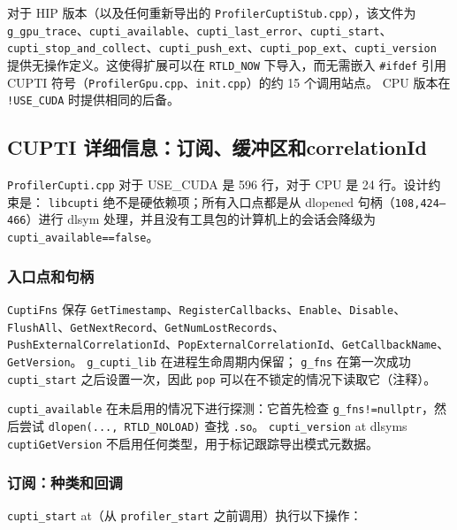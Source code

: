 对于 HIP 版本（以及任何重新导出的 \texttt{ProfilerCuptiStub.cpp}），该文件为 \texttt{g\_gpu\_trace}、\texttt{cupti\_available}、\texttt{cupti\_last\_error}、\texttt{cupti\_start}、\texttt{cupti\_stop\_and\_collect}、\texttt{cupti\_push\_ext}、\texttt{cupti\_pop\_ext}、\texttt{cupti\_version} 提供无操作定义。这使得扩展可以在 \texttt{RTLD\_NOW} 下导入，而无需嵌入 \texttt{\#ifdef} 引用 CUPTI 符号（\texttt{ProfilerGpu.cpp}、\texttt{init.cpp}）的约 15 个调用站点。 CPU 版本在 \texttt{!USE\_CUDA} 时提供相同的后备。

\subsection{CUPTI 详细信息：订阅、缓冲区和correlationId}

\texttt{ProfilerCupti.cpp} 对于 USE\_CUDA 是 596 行，对于 CPU 是 24 行。设计约束是： \texttt{libcupti} 绝不是硬依赖项；所有入口点都是从 dlopened 句柄（\texttt{108,424--466}）进行 dlsym 处理，并且没有工具包的计算机上的会话会降级为 \texttt{cupti\_available==false}。

\subsubsection{入口点和句柄}

\texttt{CuptiFns} 保存 \texttt{GetTimestamp}、\texttt{RegisterCallbacks}、\texttt{Enable}、\texttt{Disable}、\texttt{FlushAll}、\texttt{GetNextRecord}、\texttt{GetNumLostRecords}、\texttt{PushExternalCorrelationId}、\texttt{PopExternalCorrelationId}、\texttt{GetCallbackName}、\texttt{GetVersion}。 \texttt{g\_cupti\_lib} 在进程生命周期内保留； \texttt{g\_fns} 在第一次成功 \texttt{cupti\_start} 之后设置一次，因此 \texttt{pop} 可以在不锁定的情况下读取它（注释）。

\texttt{cupti\_available} 在未启用的情况下进行探测：它首先检查 \texttt{g\_fns!=nullptr}，然后尝试 \texttt{dlopen(..., RTLD\_NOLOAD)} 查找 \texttt{.so}。 \texttt{cupti\_version} at dlsyms \texttt{cuptiGetVersion} 不启用任何类型，用于标记跟踪导出模式元数据。

\subsubsection{订阅：种类和回调}

\texttt{cupti\_start} at（从 \texttt{profiler\_start} 之前调用）执行以下操作：

